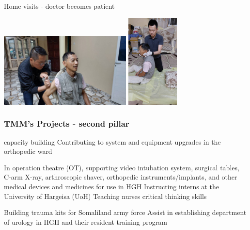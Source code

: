 \documentclass[aspectratio=169]{beamer}
\begin{document}
\begin{frame}{Home visits - doctor becomes patient}
    \begin{center}
        \includegraphics[width=0.50\textwidth]{IMG-2343.JPG}
        \includegraphics[width=0.20\textwidth]{IMG-2338.JPG}
    \end{center}
\end{frame}

\begin{frame}
\frametitle{TMM's Projects - second pillar}
\begin{outline}    
    \1 capacity building
        \2 Contributing to system and equipment upgrades in the orthopedic ward

        \2 In operation theatre (OT), supporting video intubation system, surgical tables, C-arm X-ray, arthroscopic shaver, orthopedic instruments/implants, and other medical devices and medicines for use in HGH
        \2 Instructing interns at the University of Hargeisa (UoH)
        \2 Teaching nurses critical thinking skills

        \2 Building trauma kits for Somaliland army force
        \2 Assist in establishing department of urology in HGH and their resident training program
\end{outline}
\end{frame}
\end{document}
